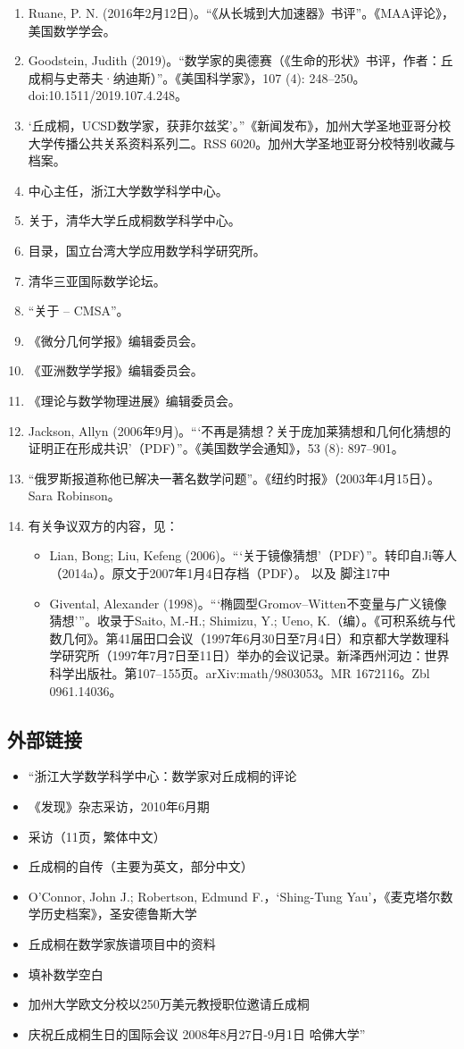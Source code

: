 \begin{enumerate}
\item Ruane, P. N. (2016年2月12日)。“《从长城到大加速器》书评”。《MAA评论》，美国数学学会。  
\item Goodstein, Judith (2019)。“数学家的奥德赛（《生命的形状》书评，作者：丘成桐与史蒂夫·纳迪斯）”。《美国科学家》，107 (4): 248–250。doi:10.1511/2019.107.4.248。
\item ‘丘成桐，UCSD数学家，获菲尔兹奖’。”《新闻发布》，加州大学圣地亚哥分校大学传播公共关系资料系列二。RSS 6020。加州大学圣地亚哥分校特别收藏与档案。  
\item 中心主任，浙江大学数学科学中心。  
\item 关于，清华大学丘成桐数学科学中心。  
\item 目录，国立台湾大学应用数学科学研究所。  
\item 清华三亚国际数学论坛。  
\item “关于 – CMSA”。  
\item 《微分几何学报》编辑委员会。  
\item 《亚洲数学学报》编辑委员会。  
\item 《理论与数学物理进展》编辑委员会。
\item Jackson, Allyn (2006年9月)。“‘不再是猜想？关于庞加莱猜想和几何化猜想的证明正在形成共识’（PDF）”。《美国数学会通知》，53 (8): 897–901。  
\item “俄罗斯报道称他已解决一著名数学问题”。《纽约时报》（2003年4月15日）。Sara Robinson。  
\item 有关争议双方的内容，见：  
\begin{itemize}
\item Lian, Bong; Liu, Kefeng (2006)。“‘关于镜像猜想’（PDF）”。转印自Ji等人（2014a）。原文于2007年1月4日存档（PDF）。  
以及  
脚注17中  
\item Givental, Alexander (1998)。“‘椭圆型Gromov–Witten不变量与广义镜像猜想’”。收录于Saito, M.-H.; Shimizu, Y.; Ueno, K.（编）。《可积系统与代数几何》。第41届田口会议（1997年6月30日至7月4日）和京都大学数理科学研究所（1997年7月7日至11日）举办的会议记录。新泽西州河边：世界科学出版社。第107–155页。arXiv:math/9803053。MR 1672116。Zbl 0961.14036。
\end{itemize}
\end{enumerate}
\subsection{外部链接}
\begin{itemize}
\item “浙江大学数学科学中心：数学家对丘成桐的评论  
\item 《发现》杂志采访，2010年6月期  
\item 采访（11页，繁体中文）  
\item 丘成桐的自传（主要为英文，部分中文）  
\item O'Connor, John J.; Robertson, Edmund F.，‘Shing-Tung Yau’，《麦克塔尔数学历史档案》，圣安德鲁斯大学  
\item 丘成桐在数学家族谱项目中的资料  
\item 填补数学空白  
\item 加州大学欧文分校以250万美元教授职位邀请丘成桐  
\item 庆祝丘成桐生日的国际会议 2008年8月27日-9月1日 哈佛大学”
\end{itemize}